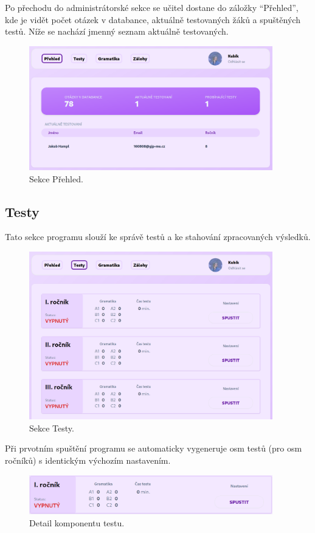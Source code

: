 Po přechodu do administrátorské sekce se učitel dostane do záložky \enquote{Přehled}, kde je vidět počet otázek v databance, aktuálně testovaných žáků a spuštěných testů. Níže se nachází jmenný seznam aktuálně testovaných.

\begin{figure}[H]
    \centering
    \includegraphics[width=400px]{images/01design/admin-index.png}
    \caption{Sekce Přehled.}
\end{figure}

\subsection{Testy}

Tato sekce programu slouží ke správě testů a ke stahování zpracovaných výsledků.

\begin{figure}[H]
    \centering
    \includegraphics[width=400px]{images/01design/tests.png}
    \caption{Sekce Testy.}
\end{figure}

Při prvotním spuštění programu se automaticky vygeneruje osm testů (pro osm ročníků) s identickým výchozím nastavením. 

\begin{figure}[H]
    \centering
    \includegraphics[width=400px]{images/01design/test.png}
    \caption{Detail komponentu testu.}
\end{figure}

